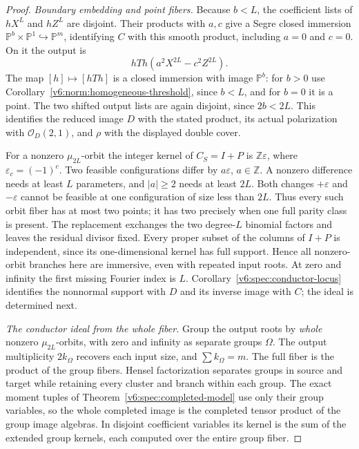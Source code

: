 \documentclass[10pt,fleqn]{article}
\numberwithin{equation}{section}
\newcommand{\PP}{\mathbb P}
\begin{document}
\begin{proof}
\emph{Boundary embedding and point fibers.}
Because $b<L$, the coefficient lists of $hX^L$ and $hZ^L$ are disjoint.
Their products with $a,c$ give a Segre closed immersion
$\PP^b\times\PP^1\hookrightarrow\PP^m$, identifying $C$ with this
smooth product, including $a=0$ and $c=0$.  On it the output is
\[
 hTh(a^2X^{2L}-c^2Z^{2L}).
\]
The map $[h]\mapsto[hTh]$ is a closed immersion with image $\PP^b$:
for $b>0$ use Corollary~\ref{v6:norm:homogeneous-threshold}, since
$b<L$, and for $b=0$ it is a point.  The two shifted output lists are
again disjoint, since $2b<2L$.  This identifies the reduced image $D$
with the stated product, its actual polarization with $\mathcal O_D(2,1)$,
and $\rho$ with the displayed double cover.

For a nonzero $\mu_{2L}$-orbit the integer kernel of $C_S=I+P$ is
$\mathbb Z\varepsilon$, where $\varepsilon_c=(-1)^c$.
Two feasible configurations differ by $a\varepsilon$, $a\in\mathbb Z$.
A nonzero difference needs at least $L$ parameters, and $|a|\ge2$
needs at least $2L$.  Both changes $+\varepsilon$ and $-\varepsilon$
cannot be feasible at one configuration of size less than $2L$.
Thus every such orbit fiber has at most two points; it has two precisely
when one full parity class is present.  The replacement exchanges the
two degree-$L$ binomial factors and leaves the residual divisor fixed.
Every proper subset of the columns of $I+P$ is independent, since its
one-dimensional kernel has full support.  Hence all nonzero-orbit
branches here are immersive, even with repeated input roots.
At zero and infinity the first missing Fourier index is $L$.
Corollary~\ref{v6:spec:conductor-locus} identifies the nonnormal support
with $D$ and its inverse image with $C$; the ideal is determined next.

\emph{The conductor ideal from the whole fiber.}
Group the output roots by \emph{whole} nonzero $\mu_{2L}$-orbits,
with zero and infinity as separate groups $\Omega$.
The output multiplicity $2k_\Omega$ recovers each input size, and
$\sum k_\Omega=m$.  The full fiber is the product of the group fibers.
Hensel factorization separates groups in source and target while retaining
every cluster and branch within each group.  The exact moment tuples of
Theorem~\ref{v6:spec:completed-model} use only their group variables, so
the whole completed image is the completed tensor product of the group
image algebras.  In disjoint coefficient variables its kernel is the
sum of the extended group kernels, each computed over the entire group fiber.


\end{proof}
\end{document}
